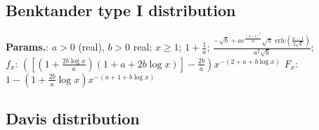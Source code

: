     
        
\subsection{Benktander type I distribution}





    {\color{darkblue} \textbf{Params.}:} {$a>0$ (real),  $b>0$ real}; {$x\geq 1$}; {$1+\tfrac{1}{a}$}; {$ \frac{-\sqrt{b}+ae^{\frac{(a-1)^2}{4b}}\sqrt{\pi}\;\textrm{erfc}\left(\frac{a-1}{2\sqrt{b}}\right)}{a^2\sqrt{b}}$};\hspace{0.5cm}\\{\color{darkblue} \textbf{$f_x$}:} {$ \left(\left[\left(1+\frac{2b\log x}{a}\right)\left(1+a+2b\log x\right)\right]-\frac{2b}{a}\right)x^{-\left(2+a+b\log x\right)} $}{\color{darkblue} \textbf{$F_x$}:} {$ 1 - \left(1+\frac{2b}{a}\log x\right)x^{-\left(a + 1 + b\log x\right)} $}



    
        
\subsection{Davis distribution}





